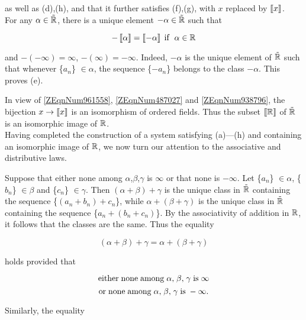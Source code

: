\documentclass{article}
\begin{document}
\noindent as well as (d),(h), and that it further satisfies
(f),(g), with $x$ replaced by
$\left[\kern-0.15em\left[x\right]\kern-0.15em\right]$.\\

For any $\alpha\in\tilde{{\bf {\mathbb R}}}$, there is a
unique element $-\alpha\in\tilde{{\bf {\mathbb R}}}$ such
that

\[-\left[\kern-0.15em\left[\alpha\right]\kern-0.15em\right]=\left[\kern-0.15em\left[-\alpha\right]\kern-0.15em\right]{\rm \; if\; \; }\alpha\in {\bf {\mathbb R}}\]

\noindent and $-(-\infty)=\infty$, $-(\infty)=-\infty$. Indeed, $-\alpha$ is the unique element of $\tilde{{\bf {\mathbb R}}}$ such that whenever \{$a_{n}$\} $\in\alpha$, the sequence \{$-a_{n}$\} belongs to the class $-\alpha$. This proves (e).

In view of \eqref{ZEqnNum961558}, \eqref{ZEqnNum487027} and \eqref{ZEqnNum938796}, the bijection $x\rightarrow\left[\kern-0.15em\left[x\right]\kern-0.15em\right]$ is an isomorphism of ordered fields. Thus the subset $\left[\kern-0.15em\left[{\bf {\mathbb R}}\right]\kern-0.15em\right]$ of $\tilde{{\bf {\mathbb R}}}$ is an isomorphic image of ${\bf {\mathbb R}}$.
\\

Having completed the construction of a system satisfying (a)---(h)
and containing an isomorphic image of ${\bf {\mathbb R}}$, we now
turn our attention to the associative and distributive laws.

Suppose that either none among $\alpha$,$\beta$,$\gamma$ is
$\infty$ or that none is $-\infty$. Let \{$a_{n}$\} $\in\alpha$, \{$b_{n}$\} $\in\beta$ and \{$c_{n}$\} $\in\gamma$. Then $(\alpha+\beta)+\gamma$ is the unique class in
$\tilde{{\bf {\mathbb R}}}$ containing the sequence \{$(a_{n}+b_{n})+c_{n}$\}, while $\alpha+(\beta+\gamma)$ is the
unique class in $\tilde{{\bf {\mathbb R}}}$ containing the
sequence \{$a_{n}+(b_{n}+c_{n})$\}. By the associativity of
addition in ${\bf {\mathbb R}}$, it follows that the classes are
the same. Thus the equality

\[(\alpha+\beta)+\gamma =\alpha+(\beta+\gamma)\]

\noindent holds provided that

\[{\rm either\; none\; among\; }\alpha {\rm ,\; }\beta {\rm ,\; }\gamma {\rm \; is\; }\infty \]
\[{\rm or\; none\; among\; }\alpha {\rm ,\; }\beta {\rm ,\; }\gamma {\rm \; is\; }-\infty .\]

\noindent Similarly, the equality
\end{document}
